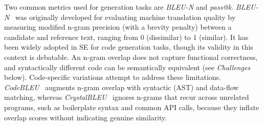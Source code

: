 Two common metrics used for generation tasks are \emph{BLEU-N} and \emph{pass@k}.
\emph{BLEU-N}~\cite{DBLP:conf/acl/PapineniRWZ02} was originally developed for evaluating machine translation quality by measuring modified n-gram precision (with a brevity penalty) between a candidate and reference text, ranging from 0 (dissimilar) to 1 (similar). It has been widely adopted in SE for code generation tasks, though its validity in this context is debatable. An n-gram overlap does not capture functional correctness, and syntactically different code can be semantically equivalent (see \emph{Challenges} below).
Code-specific variations attempt to address these limitations. \emph{CodeBLEU}~\cite{DBLP:journals/corr/abs-2009-10297} augments n-gram overlap with syntactic (AST) and data-flow matching, whereas \emph{CrystalBLEU}~\cite{DBLP:conf/kbse/EghbaliP22} ignores n-grams that recur across unrelated programs, such as boilerplate syntax and common API calls, because they inflate overlap scores without indicating genuine similarity.

